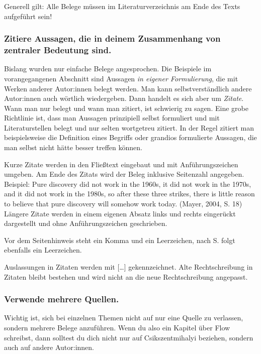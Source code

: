 \documentclass{../cssheet}
\begin{document}
Generell gilt: Alle Belege müssen im Literaturverzeichnis am Ende des
Texts aufgeführt sein!

\subsubsection*{Zitiere Aussagen, die in deinem Zusammenhang von zentraler Bedeutung
sind.}

Bislang wurden nur einfache Belege angesprochen. Die Beispiele im
vorangegangenen Abschnitt sind Aussagen \emph{in eigener Formulierung},
die mit Werken anderer Autor:innen belegt werden. Man kann
selbstverständlich andere Autor:innen auch wörtlich wiedergeben. Dann
handelt es sich aber um \emph{Zitate}. Wann man nur belegt und wann man
zitiert, ist schwierig zu sagen. Eine grobe Richtlinie ist, dass man
Aussagen prinzipiell selbst formuliert und mit Literaturstellen belegt
und nur selten wortgetreu zitiert. In der Regel zitiert man
beispielsweise die Definition eines Begriffs oder grandios formulierte
Aussagen, die man selbst nicht hätte besser treffen können.

Kurze Zitate werden in den Fließtext eingebaut und mit Anführungszeichen
umgeben. Am Ende des Zitats wird der Beleg inklusive Seitenzahl
angegeben. Beispiel: \glqq{}Pure discovery did not work in the 1960s, it did
not work in the 1970s, and it did not work in the 1980s, so after these
three strikes, there is little reason to believe that pure discovery
will somehow work today.\grqq{} (Mayer, 2004, S. 18) Längere Zitate werden in
einem eigenen Absatz links und rechts eingerückt dargestellt und ohne
Anführungszeichen geschrieben.

Vor dem Seitenhinweis steht ein Komma und ein Leerzeichen, nach \glqq{}S.\grqq{}
folgt ebenfalls ein Leerzeichen.

Auslassungen in Zitaten werden mit [\ldots] gekennzeichnet. Alte
Rechtschreibung in Zitaten bleibt bestehen und wird nicht an die neue
Rechtschreibung angepasst.

\subsubsection*{Verwende mehrere Quellen.}

Wichtig ist, sich bei einzelnen Themen nicht auf nur eine Quelle zu
verlassen, sondern mehrere Belege anzuführen. Wenn du also ein Kapitel
über Flow schreibst, dann solltest du dich nicht nur auf
Csikszentmihalyi beziehen, sondern auch auf andere Autor:innen.
\end{document}
